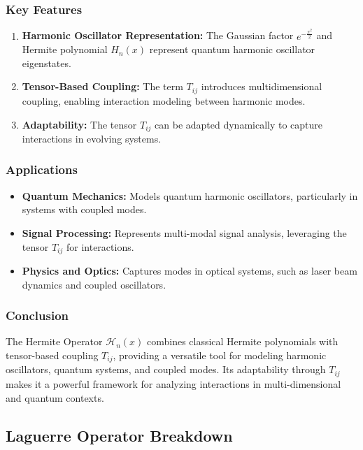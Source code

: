 \documentclass{article}
\theoremstyle{plain}
\begin{document}
\begin{itemize}
\subsubsection*{Key Features}
\begin{enumerate}
    \item \textbf{Harmonic Oscillator Representation:} The Gaussian factor \( e^{-\frac{x^2}{2}} \) and Hermite polynomial \( H_n(x) \) represent quantum harmonic oscillator eigenstates.
    \item \textbf{Tensor-Based Coupling:} The term \( T_{ij} \) introduces multidimensional coupling, enabling interaction modeling between harmonic modes.
    \item \textbf{Adaptability:} The tensor \( T_{ij} \) can be adapted dynamically to capture interactions in evolving systems.
\end{enumerate}

\subsubsection*{Applications}
\begin{itemize}
    \item \textbf{Quantum Mechanics:} Models quantum harmonic oscillators, particularly in systems with coupled modes.
    \item \textbf{Signal Processing:} Represents multi-modal signal analysis, leveraging the tensor \( T_{ij} \) for interactions.
    \item \textbf{Physics and Optics:} Captures modes in optical systems, such as laser beam dynamics and coupled oscillators.
\end{itemize}

\subsubsection*{Conclusion}
The Hermite Operator \( \mathcal{H}_n(x) \) combines classical Hermite polynomials with tensor-based coupling \( T_{ij} \), providing a versatile tool for modeling harmonic oscillators, quantum systems, and coupled modes. Its adaptability through \( T_{ij} \) makes it a powerful framework for analyzing interactions in multi-dimensional and quantum contexts.


\subsection{Laguerre Operator Breakdown}


\end{itemize}
\end{document}
